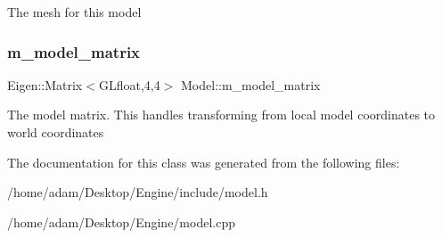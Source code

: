 The mesh for this model \mbox{\label{classModel_a41d60873613f3b75c8242df3bbb44ca9}} 
\subsubsection{\texorpdfstring{m\+\_\+model\+\_\+matrix}{m\_model\_matrix}}
{\footnotesize\ttfamily Eigen\+::\+Matrix$<$G\+Lfloat,4,4$>$ Model\+::m\+\_\+model\+\_\+matrix\hspace{0.3cm}{\ttfamily [protected]}}

The model matrix. This handles transforming from local model coordinates to world coordinates 

The documentation for this class was generated from the following files\+:\begin{DoxyCompactItemize}
\item 
/home/adam/\+Desktop/\+Engine/include/model.\+h\item 
/home/adam/\+Desktop/\+Engine/model.\+cpp\end{DoxyCompactItemize}
